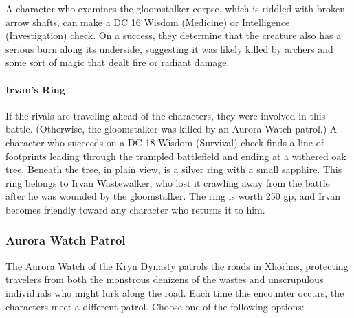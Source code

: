 \documentclass[letterpaper, 11pt, bg=full, twocolumn]{dndbook}
\begin{document}
A character who examines the gloomstalker corpse, which is riddled with broken arrow shafts, can make a DC 16 Wisdom (Medicine) or Intelligence (Investigation) check. On a success, they determine that the creature also has a serious burn along its underside, suggesting it was likely killed by archers and some sort of magic that dealt fire or radiant damage.

\paragraph{Irvan's Ring}

If the rivals are traveling ahead of the characters, they were involved in this battle. (Otherwise, the gloomstalker was killed by an Aurora Watch patrol.) A character who succeeds on a DC 18 Wisdom (Survival) check finds a line of footprints leading through the trampled battlefield and ending at a withered oak tree. Beneath the tree, in plain view, is a silver ring with a small sapphire. This ring belongs to Irvan Wastewalker, who lost it crawling away from the battle after he was wounded by the gloomstalker. The ring is worth 250 gp, and Irvan becomes friendly toward any character who returns it to him.

\subsubsection{Aurora Watch Patrol}

The Aurora Watch of the Kryn Dynasty patrols the roads in Xhorhas, protecting travelers from both the monstrous denizens of the wastes and unscrupulous individuals who might lurk along the road. Each time this encounter occurs, the characters meet a different patrol. Choose one of the following options:
\end{document}

